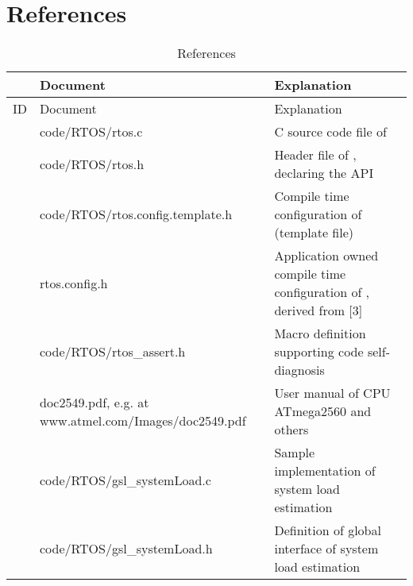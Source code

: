 \chapter*{References}
\label{secDocReferences}

\def\refRTOSC{[1]}
\def\refRTOSH{[2]}
\def\refRTOSConfigTemplateH{[3]}
\def\refRTOSConfigH{[4]}
\def\refRTOSAssertH{[5]}
\def\refATmegaManual{[6]}
\def\refGSLSystemLoadC{[7]}
\def\refGSLSystemLoadH{[8]}

\begin{longtable}[c]{|c|p{5.5cm}|p{8.0cm}|}
\hline
& Document & Explanation \\ \hline
\endfirsthead
\hline
ID & Document & Explanation \\ \hline
\hline
\endhead
\caption[]{References (continued on next page)}
\endfoot
\caption{References} \label{tabDocReferences}
\endlastfoot
\hline
\refRTOSC & code/RTOS/rtos.c
          & C source code file of \rtos{}
\\ \hline
\refRTOSH & code/RTOS/rtos.h
          & Header file of \rtos{}, declaring the API
\\ \hline
\refRTOSConfigTemplateH & code/RTOS/rtos.\-config.\-tem\-plate.h 
                        & Compile time configuration of \rtos{} (template file)
\\ \hline
\refRTOSConfigH & rtos.config.h
                & Application owned compile time configuration of \rtos{}, derived
                  from \refRTOSConfigTemplateH
\\ \hline
\refRTOSAssertH & code/RTOS/rtos\-\_assert.h
                & Macro definition supporting code self-diagnosis
\\ \hline
\refATmegaManual & doc2549.pdf, e.g. at www.\-atmel.\-com/\-Ima\-ges/\-doc\-2549.pdf
                 & User manual of CPU ATmega2560 and others
\\ \hline
\refGSLSystemLoadC 
  & code/RTOS/gsl\-\_sys\-tem\-Load.c
  & Sample implementation of system load estimation
\\ \hline
\refGSLSystemLoadH
  & code/RTOS/gsl\-\_sys\-tem\-Load.h
  & Definition of global interface of system load estimation
\\ \hline
\end{longtable}


